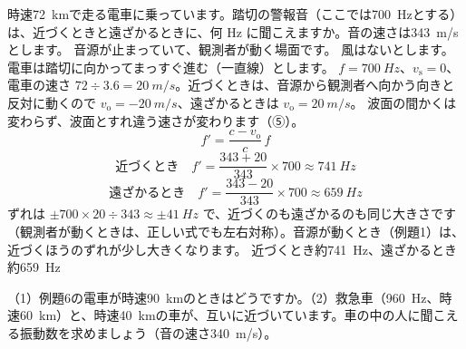 \label{ph:波-8:ex6}
\begin{phreidai}
時速\qty{72}{km}で走る電車に乗っています。踏切の警報音（ここでは\qty{700}{Hz}とする）は、近づくときと遠ざかるときに、何 Hz に聞こえますか。音の速さは\qty{343}{m/s}とします。
\phbamen
音源が止まっていて、観測者が動く場面です。
\phmushi
風はないとします。電車は踏切に向かってまっすぐ進む（一直線）とします。
\phzu
$f=\qty{700}{Hz}$、$v_{\mathrm s}=0$、電車の速さ $72\div3.6=\qty{20}{m/s}$。近づくときは、音源から観測者へ向かう向きと反対に動くので $v_{\mathrm o}=\qty{-20}{m/s}$、遠ざかるときは $v_{\mathrm o}=\qty{+20}{m/s}$。
\phriyu
波面の間かくは変わらず、波面とすれ違う速さが変わります（⑤）。
\phtateru
\[f'=\frac{c-v_{\mathrm o}}{c}\,f\]
\phtoku
\[\text{近づくとき}\quad f'=\frac{343+20}{343}\times700\approx\qty{741}{Hz}\]
\[\text{遠ざかるとき}\quad f'=\frac{343-20}{343}\times700\approx\qty{659}{Hz}\]
\phtashikame
ずれは $\pm700\times20\div343\approx\pm\qty{41}{Hz}$ で、近づくのも遠ざかるのも同じ大きさです（観測者が動くときは、正しい式でも左右対称）。音源が動くとき（例題1）は、近づくほうのずれが少し大きくなります。
\kotae 近づくとき約\qty{741}{Hz}、遠ざかるとき約\qty{659}{Hz}
\end{phreidai}
\begin{jibun}
（1）例題6の電車が時速\qty{90}{km}のときはどうですか。（2）救急車（\qty{960}{Hz}、時速\qty{60}{km}）と、時速\qty{40}{km}の車が、互いに近づいています。車の中の人に聞こえる振動数を求めましょう（音の速さ\qty{340}{m/s}）。
\end{jibun}

